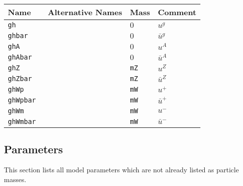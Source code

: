 \documentclass[11pt,a4paper]{refrep}
\begin{document}
\begin{tabular}{|l|l|l|p{2cm}|}
\hline
Name&Alternative Names&Mass&Comment\\
\hline
\tt gh &  & $0$ & $u^g$\\
\tt ghbar &  & $0$ & $\bar{u}^g$ \\
\tt ghA &  & $0$ & $u^A$ \\
\tt ghAbar &  & $0$ & $\bar{u}^A$ \\
\tt ghZ &  & \tt mZ & $u^Z$ \\
\tt ghZbar &  & \tt mZ & $\bar{u}^Z$ \\
\tt ghWp &  & \tt mW & $u^+$ \\
\tt ghWpbar &  & \tt mW & $\bar{u}^+$ \\
\tt ghWm &  & \tt mW & $u^-$ \\
\tt ghWmbar &  & \tt mW & $\bar{u}^-$ \\
\hline
\end{tabular}

\subsection{Parameters}
This section lists all model parameters which are not already
listed as particle masses.
\end{document}
